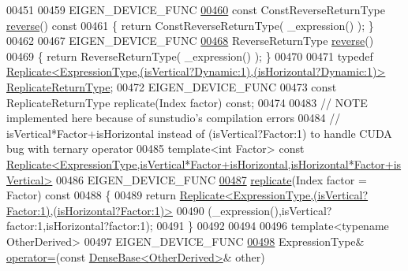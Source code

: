 \begin{DoxyCode}
00451 
00459     EIGEN\_DEVICE\_FUNC
\hyperlink{group___core___module_a058b821b65e2e27839853d9a25b0216c}{00460}     \textcolor{keyword}{const} ConstReverseReturnType \hyperlink{group___core___module_a058b821b65e2e27839853d9a25b0216c}{reverse}()\textcolor{keyword}{ const}
00461 \textcolor{keyword}{    }\{ \textcolor{keywordflow}{return} ConstReverseReturnType( \_expression() ); \}
00462 
00467     EIGEN\_DEVICE\_FUNC
\hyperlink{group___core___module_a094915725d604015221205e8c4ccb993}{00468}     ReverseReturnType \hyperlink{group___core___module_a094915725d604015221205e8c4ccb993}{reverse}()
00469     \{ \textcolor{keywordflow}{return} ReverseReturnType( \_expression() ); \}
00470 
00471     \textcolor{keyword}{typedef} 
      \hyperlink{group___core___module_class_eigen_1_1_replicate}{Replicate<ExpressionType,(isVertical?Dynamic:1),(isHorizontal?Dynamic:1)>}
       \hyperlink{group___core___module_class_eigen_1_1_replicate}{ReplicateReturnType};
00472     EIGEN\_DEVICE\_FUNC
00473     \textcolor{keyword}{const} ReplicateReturnType replicate(Index factor) \textcolor{keyword}{const};
00474 
00483     \textcolor{comment}{// NOTE implemented here because of sunstudio's compilation errors}
00484     \textcolor{comment}{// isVertical*Factor+isHorizontal instead of (isVertical?Factor:1) to handle CUDA bug with ternary
       operator}
00485     \textcolor{keyword}{template}<\textcolor{keywordtype}{int} Factor> \textcolor{keyword}{const} 
      \hyperlink{group___core___module_class_eigen_1_1_replicate}{Replicate<ExpressionType,isVertical*Factor+isHorizontal,isHorizontal*Factor+isVertical>}
00486     EIGEN\_DEVICE\_FUNC
\hyperlink{group___core___module_adafbfe5f623bc8fdc9877eb073f1ba5c}{00487}     \hyperlink{group___core___module_adafbfe5f623bc8fdc9877eb073f1ba5c}{replicate}(Index factor = Factor)\textcolor{keyword}{ const}
00488 \textcolor{keyword}{    }\{
00489       \textcolor{keywordflow}{return} 
      \hyperlink{group___core___module_class_eigen_1_1_replicate}{Replicate<ExpressionType,(isVertical?Factor:1),(isHorizontal?Factor:1)>}
00490           (\_expression(),isVertical?factor:1,isHorizontal?factor:1);
00491     \}
00492 
00494 
00496     \textcolor{keyword}{template}<\textcolor{keyword}{typename} OtherDerived>
00497     EIGEN\_DEVICE\_FUNC
\hyperlink{group___core___module_a61f54a2994758cc098671d5f0f36cfa6}{00498}     ExpressionType& \hyperlink{group___core___module_a61f54a2994758cc098671d5f0f36cfa6}{operator=}(\textcolor{keyword}{const} \hyperlink{group___core___module_class_eigen_1_1_dense_base}{DenseBase<OtherDerived>}& other)

\end{DoxyCode}
